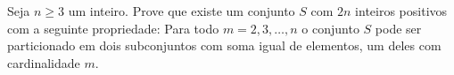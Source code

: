 Seja $n \ge 3$ um inteiro. Prove que existe um conjunto $S$ com $2n$ inteiros positivos com a seguinte propriedade: Para todo $m = 2, 3, \dots, n$ o conjunto $S$ pode ser particionado em dois subconjuntos com soma igual de elementos, um deles com cardinalidade $m$.
